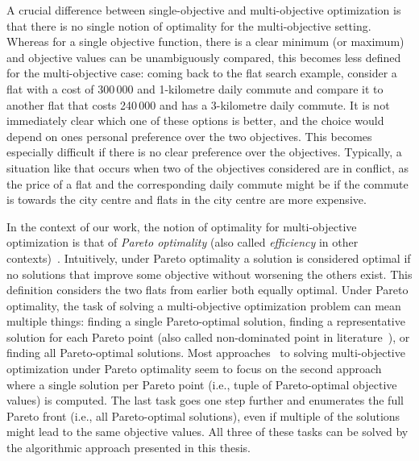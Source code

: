 A crucial difference between single-objective and multi-objective optimization is that there is no single notion of optimality for the multi-objective setting.
Whereas for a single objective function, there is a clear minimum (or maximum) and objective values can be unambiguously compared, this becomes less defined for the multi-objective case:
coming back to the flat search example, consider a flat with a cost of 300\,000 \texteuro{} and 1-kilometre daily commute and compare it to another flat that costs 240\,000 \texteuro{} and has a 3-kilometre daily commute.
It is not immediately clear which one of these options is better, and the choice would depend on ones personal preference over the two objectives.
This becomes especially difficult if there is no clear preference over the objectives.
Typically, a situation like that occurs when two of the objectives considered are in conflict, as the price of a flat and the corresponding daily commute might be if the commute is towards the city centre and flats in the city centre are more expensive.

In the context of our work, the notion of optimality for multi-objective optimization is that of \emph{Pareto optimality} (also called \emph{efficiency} in other contexts)~\autocite{Ehrgott2005-2}.
Intuitively, under Pareto optimality a solution is considered optimal if no solutions that improve some objective without worsening the others exist.
This definition considers the two flats from earlier both equally optimal.
Under Pareto optimality, the task of solving a multi-objective optimization problem can mean multiple things:
finding a single Pareto-optimal solution, finding a representative solution for each Pareto point (also called non-dominated point in literature~\autocite{Ehrgott2005-2}), or finding all Pareto-optimal solutions.
Most approaches~\autocite{DBLP:conf/cp/SohBTB17,DBLP:conf/cp/JanotaMSM21,DBLP:conf/ijcai/Terra-NevesLM18a} to solving multi-objective optimization under Pareto optimality seem to focus on the second approach where a single solution per Pareto point (i.e., tuple of Pareto-optimal objective values) is computed.
The last task goes one step further and enumerates the full Pareto front (i.e., all Pareto-optimal solutions), even if multiple of the solutions might lead to the same objective values.
All three of these tasks can be solved by the algorithmic approach presented in this thesis.

